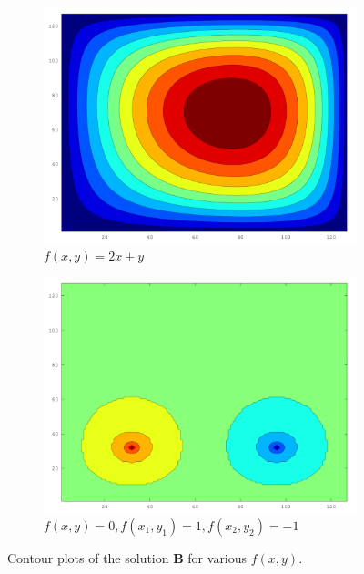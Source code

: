 \begin{figure}[htbp]
  \begin{subfigure}[b]{0.49\textwidth}
    \includegraphics[width=\textwidth]{illustrations/xy.png}
    \caption{$f(x,y) = 2x+y$}
    \label{fig:contour_3}
  \end{subfigure}
  \begin{subfigure}[b]{0.49\textwidth}
    \includegraphics[width=\textwidth]{illustrations/2_points.png}
    \caption{$f(x,y)=0, f(x_1,y_1)=1,f(x_2,y_2)=-1$}
    \label{fig:contour_4}
  \end{subfigure}
  \caption{Contour plots of the solution $\mathbf{B}$ for various $f(x,y)$.}
  \label{fig:contourplots}
\end{figure}

\clearpage



